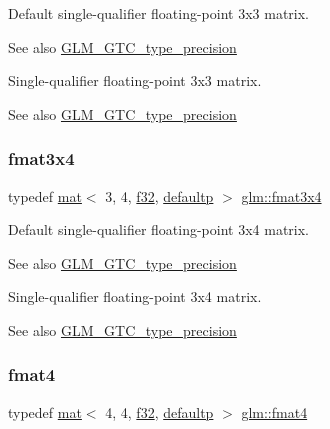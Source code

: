 Default single-\/qualifier floating-\/point 3x3 matrix. \begin{DoxySeeAlso}{See also}
\mbox{\hyperlink{group__gtc__type__precision}{G\+L\+M\+\_\+\+G\+T\+C\+\_\+type\+\_\+precision}}
\end{DoxySeeAlso}
Single-\/qualifier floating-\/point 3x3 matrix. \begin{DoxySeeAlso}{See also}
\mbox{\hyperlink{group__gtc__type__precision}{G\+L\+M\+\_\+\+G\+T\+C\+\_\+type\+\_\+precision}} 
\end{DoxySeeAlso}
\mbox{\label{group__gtc__type__precision_gab2daf8468a8b9343c065816df07e29fe}} 
\subsubsection{\texorpdfstring{fmat3x4}{fmat3x4}}
{\footnotesize\ttfamily typedef \mbox{\hyperlink{structglm_1_1mat}{mat}}$<$ 3, 4, \mbox{\hyperlink{group__gtc__type__precision_ga0ec999b57f5330d9021256e96038df04}{f32}}, \mbox{\hyperlink{namespaceglm_a36ed105b07c7746804d7fdc7cc90ff25a9d21ccd8b5a009ec7eb7677befc3bf51}{defaultp}} $>$ \mbox{\hyperlink{group__gtc__type__precision_gab2daf8468a8b9343c065816df07e29fe}{glm\+::fmat3x4}}}

Default single-\/qualifier floating-\/point 3x4 matrix. \begin{DoxySeeAlso}{See also}
\mbox{\hyperlink{group__gtc__type__precision}{G\+L\+M\+\_\+\+G\+T\+C\+\_\+type\+\_\+precision}}
\end{DoxySeeAlso}
Single-\/qualifier floating-\/point 3x4 matrix. \begin{DoxySeeAlso}{See also}
\mbox{\hyperlink{group__gtc__type__precision}{G\+L\+M\+\_\+\+G\+T\+C\+\_\+type\+\_\+precision}} 
\end{DoxySeeAlso}
\mbox{\label{group__gtc__type__precision_ga96345dda8e140bf8511b3e53128c0196}} 
\subsubsection{\texorpdfstring{fmat4}{fmat4}}
{\footnotesize\ttfamily typedef \mbox{\hyperlink{structglm_1_1mat}{mat}}$<$ 4, 4, \mbox{\hyperlink{group__gtc__type__precision_ga0ec999b57f5330d9021256e96038df04}{f32}}, \mbox{\hyperlink{namespaceglm_a36ed105b07c7746804d7fdc7cc90ff25a9d21ccd8b5a009ec7eb7677befc3bf51}{defaultp}} $>$ \mbox{\hyperlink{group__gtc__type__precision_ga96345dda8e140bf8511b3e53128c0196}{glm\+::fmat4}}}

